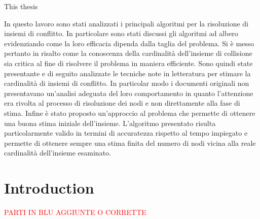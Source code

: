 \documentclass[11pt,a4paper,twoside,openright]{book}
\newcommand{\fncyblank}{\fancyhf{}}
\newenvironment{abstract}%
{\cleardoublepage \fncyblank \null \vspace{\stretch{1}} \begin{center}%
\bfseries \abstractname \end{center}}%
{\vspace{\stretch{3}}\null}
\begin{document}
\begin{abstract}
This thesis
\end{abstract}
\begin{abstract}
In questo lavoro sono stati analizzati i principali algoritmi per la risoluzione di insiemi di conflitto. In particolare sono stati discussi gli algoritmi ad albero evidenziando come la loro efficacia dipenda dalla taglia del problema. Si è messo pertanto in risalto come la conoscenza della cardinalità dell'insieme di collisione sia critica al fine di  risolvere il problema in maniera efficiente. Sono quindi state presentante e di seguito analizzate le tecniche note in letteratura per stimare la cardinalità di insiemi di conflitto. In particolar modo i documenti originali non presentavano un'analisi adeguata del loro comportamento in quanto l'attenzione era rivolta al processo di risoluzione dei nodi e non direttamente alla fase di stima. Infine è stato proposto un'approccio al problema che permette di ottenere una buona stima iniziale dell'insieme. L'algoritmo presentato risulta particolarmente valido in termini di accuratezza rispetto al tempo impiegato e permette di ottenere sempre una stima finita del numero di nodi vicina alla reale cardinalità dell'insieme esaminato.
\end{abstract}



\tableofcontents
\listoffigures
\listoftables

\mainmatter
\chapter{Introduction}
 
\textcolor{red}{PARTI IN BLU AGGIUNTE O CORRETTE}\\
\end{document}
